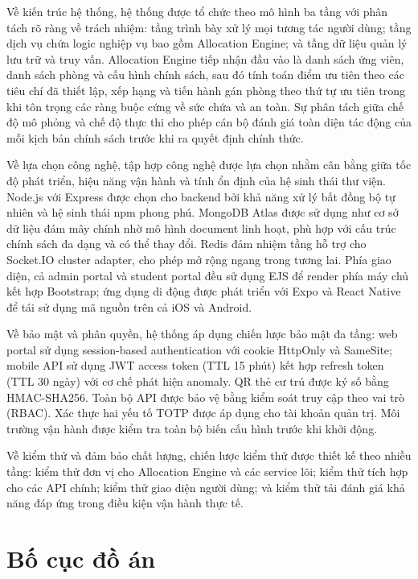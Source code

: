 ﻿\documentclass[a4paper,12pt,openany,oneside]{report}
\begin{document}
Về kiến trúc hệ thống, hệ thống được tổ chức theo mô hình ba tầng với phân tách
rõ ràng về trách nhiệm: tầng trình bày xử lý mọi tương tác người dùng; tầng
dịch vụ chứa logic nghiệp vụ bao gồm Allocation Engine; và tầng dữ liệu quản
lý lưu trữ và truy vấn. Allocation Engine tiếp nhận đầu vào là danh sách ứng
viên, danh sách phòng và cấu hình chính sách, sau đó tính toán điểm ưu tiên
theo các tiêu chí đã thiết lập, xếp hạng và tiến hành gán phòng theo thứ tự ưu
tiên trong khi tôn trọng các ràng buộc cứng về sức chứa và an toàn. Sự phân
tách giữa chế độ mô phỏng và chế độ thực thi cho phép cán bộ đánh giá toàn
diện tác động của mỗi kịch bản chính sách trước khi ra quyết định chính thức.

Về lựa chọn công nghệ, tập hợp công nghệ được lựa chọn nhằm cân bằng giữa tốc
độ phát triển, hiệu năng vận hành và tính ổn định của hệ sinh thái thư viện.
Node.js với Express được chọn cho backend bởi khả năng xử lý bất đồng bộ tự
nhiên và hệ sinh thái npm phong phú. MongoDB Atlas được sử dụng như cơ sở dữ
liệu đám mây chính nhờ mô hình document linh hoạt, phù hợp với cấu trúc chính
sách đa dạng và có thể thay đổi. Redis đảm nhiệm tầng hỗ trợ cho Socket.IO
cluster adapter, cho phép mở rộng ngang trong tương lai. Phía giao diện, cả
admin portal và student portal đều sử dụng EJS để render phía máy chủ kết hợp
Bootstrap; ứng dụng di động được phát triển với Expo và React Native để tái sử
dụng mã nguồn trên cả iOS và Android.

Về bảo mật và phân quyền, hệ thống áp dụng chiến lược bảo mật đa tầng: web
portal sử dụng session-based authentication với cookie HttpOnly và SameSite;
mobile API sử dụng JWT access token (TTL 15 phút) kết hợp refresh token (TTL 30
ngày) với cơ chế phát hiện anomaly. QR thẻ cư trú được ký số bằng HMAC-SHA256.
Toàn bộ API được bảo vệ bằng kiểm soát truy cập theo vai trò (RBAC). Xác thực
hai yếu tố TOTP được áp dụng cho tài khoản quản trị. Môi trường vận hành được
kiểm tra toàn bộ biến cấu hình trước khi khởi động.

Về kiểm thử và đảm bảo chất lượng, chiến lược kiểm thử được thiết kế theo
nhiều tầng: kiểm thử đơn vị cho Allocation Engine và các service lõi; kiểm thử
tích hợp cho các API chính; kiểm thử giao diện người dùng; và kiểm thử tải
đánh giá khả năng đáp ứng trong điều kiện vận hành thực tế.

\section{Bố cục đồ án}
\end{document}
